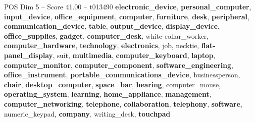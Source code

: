 \begin{textsample}{POS Dim 5 – Score 41.00 – t013490}  \label{ex:f5_pos_001}
\textbf{electronic\_device}, \textbf{personal\_computer}, \textbf{input\_device}, \textbf{office\_equipment}, \textbf{computer}, \textbf{furniture}, \textbf{desk}, \textbf{peripheral}, \textbf{communication\_device}, \textbf{table}, \textbf{output\_device}, \textbf{display\_device}, \textbf{office\_supplies}, \textbf{gadget}, \textbf{computer\_desk}, white-collar\_worker, \textbf{computer\_hardware}, \textbf{technology}, \textbf{electronics}, job, necktie, \textbf{flat-panel\_display}, suit, \textbf{multimedia}, \textbf{computer\_keyboard}, \textbf{laptop}, \textbf{computer\_monitor}, \textbf{computer\_component}, \textbf{software\_engineering}, \textbf{office\_instrument}, \textbf{portable\_communications\_device}, businessperson, \textbf{chair}, \textbf{desktop\_computer}, \textbf{space\_bar}, \textbf{hearing}, computer\_mouse, \textbf{operating\_system}, \textbf{learning}, \textbf{home\_appliance}, \textbf{management}, \textbf{computer\_networking}, \textbf{telephone}, \textbf{collaboration}, \textbf{telephony}, \textbf{software}, numeric\_keypad, \textbf{company}, writing\_desk, \textbf{touchpad}

\end{textsample}
